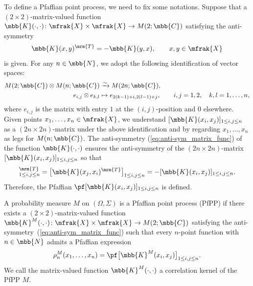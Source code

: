 To define a Pfaffian point process, we need to fix some notations.
Suppose that a $(2\times 2)$-matrix-valued function $\mbb{K}(\cdot,\cdot)\colon \mfrak{X}\times\mfrak{X}\to M(2;\mbb{C})$ satisfying the anti-symmetry
\begin{equation}\label{eq:anti-sym_matrix_func}
	\mbb{K}(x,y)^{\mrm{T}}=-\mbb{K}(y,x),\qquad x, y\in\mfrak{X}
\end{equation}
is given. For any $n\in\mbb{N}$, we adopt the following identification of vector spaces:
\begin{align*}
	M(2;\mbb{C})\otimes M(n;\mbb{C}) & \xrightarrow{\sim} M(2n;\mbb{C}),\\
	 e_{i,j}\otimes e_{k,l}&\mapsto e_{2(k-1)+i, 2(l-1)+j},\qquad i,j=1,2,\quad k,l=1,\dots, n,
\end{align*}
where $e_{i,j}$ is the matrix with entry $1$ at the $(i,j)$-position and $0$ elsewhere.
Given points $x_{1},\dots, x_{n}\in\mfrak{X}$, we understand $[\mbb{K}(x_{i},x_{j})]_{1\le i,j\le n}$ as a $(2n\times 2n)$-matrix under the above identification and by regarding $x_{1},\dots, x_{n}$ as legs for $M(n;\mbb{C})$. The anti-symmetry (\ref{eq:anti-sym_matrix_func}) of the function $\mbb{K}(\cdot,\cdot)$ ensures the anti-symmetry of the $(2n\times 2n)$-matrix $[\mbb{K}(x_{i},x_{j})]_{1\le i,j\le n}$ so that
\begin{equation*}
[\mbb{K}(x_{i},x_{j})]_{1\le i,j\le n}^{\mrm{T}}=\big[\mbb{K}(x_{j},x_{i})^{\mrm{T}}\big]_{1\le i,j\le n}=-[\mbb{K}(x_{i},x_{j})]_{1\le i,j\le n}.
\end{equation*}
Therefore, the Pfaffian $\pf [\mbb{K}(x_{i},x_{j})]_{1\le i,j\le n}$ is defined.

\begin{Definition}
A probability measure $M$ on $(\Omega,\Sigma)$ is a Pfaffian point process (PfPP) if there exists a $(2\times 2)$-matrix-valued function $\mbb{K}^{M}(\cdot,\cdot)\colon \mfrak{X}\times\mfrak{X}\to M(2;\mbb{C})$ satisfying the anti-symmetry~(\ref{eq:anti-sym_matrix_func}) such that every $n$-point function with $n\in\mbb{N}$ admits a Pfaffian expression
\begin{equation*}
	\rho_{n}^{M}(x_{1},\dots, x_{n})=\pf \big[\mbb{K}^{M}(x_{i},x_{j})\big]_{1\le i,j\le n}.
\end{equation*}
We call the matrix-valued function $\mbb{K}^{M}(\cdot,\cdot)$ a correlation kernel of the PfPP $M$.
\end{Definition}

